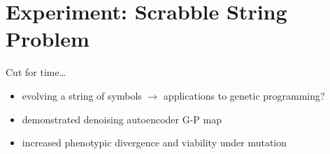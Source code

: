 \section{Experiment: Scrabble String Problem}

\begin{frame}{Cut for time\dots}
\Large
\begin{itemize}[<+->]
\item evolving a string of symbols $\rightarrow$ applications to genetic programming?
\item demonstrated denoising autoencoder G-P map
\item increased phenotypic divergence and viability under mutation
\end{itemize}
\end{frame}
